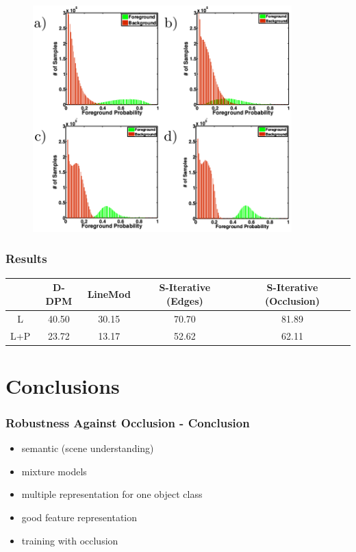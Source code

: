 \documentclass[xcolor=dvipsnames]{beamer}
\begin{document}
\begin{frame}
	\begin{figure}
	\includegraphics[width=10cm]{img/rir_1.png}
	\end{figure}
\end{frame}

\begin{frame}
	\frametitle{Results}
	
	\begin{center}
		\small
		\begin{tabular}{c|c|c|c|c}
			& D-DPM & LineMod & S-Iterative (Edges) & S-Iterative (Occlusion) \\
			\hline
			L & 40.50 & 30.15 & 70.70 & 81.89 \\
			L+P & 23.72 & 13.17 & 52.62 & 62.11 \\
		
		\end{tabular}
	\end{center}
\end{frame}

\section{Conclusions}
\begin{frame}
	\frametitle{Robustness Against Occlusion - Conclusion}
	\Large
	\begin{itemize}
		\item semantic (scene understanding)
		\item mixture models
		\item multiple representation for one object class
		\item good feature representation
		\item training with occlusion
	\end{itemize}
\end{frame}
\end{document}

